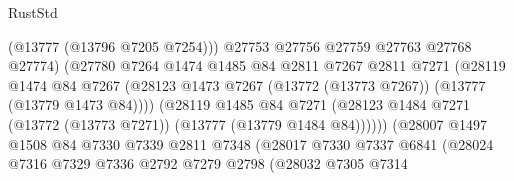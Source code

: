 \begin{lexlean}{RustStd}
\begin{coremodule}
                                        (@13777 (@13796 @7205 @7254)))
                                      @27753
                                      @27756
                                      @27759
                                      @27763
                                      @27768
                                      @27774)
                                    (@27780
                                      @7264
                                      @1474
                                      @1485
                                      @84
                                      @2811
                                      @7267
                                      @2811
                                      @7271
                                      (@28119
                                        @1474
                                        @84
                                        @7267
                                        (@28123
                                          @1473
                                          @7267
                                          (@13772 (@13773 @7267))
                                          (@13777 (@13779 @1473 @84))))
                                      (@28119
                                        @1485
                                        @84
                                        @7271
                                        (@28123
                                          @1484
                                          @7271
                                          (@13772 (@13773 @7271))
                                          (@13777 (@13779 @1484 @84))))))
                                  (@28007
                                    @1497
                                    @1508
                                    @84
                                    @7330
                                    @7339
                                    @2811
                                    @7348
                                    (@28017
                                      @7330
                                      @7337
                                      @6841
                                      (@28024
                                        @7316
                                        @7329
                                        @7336
                                        @2792
                                        @7279
                                        @2798
                                        (@28032
                                          @7305
                                          @7314

\end{coremodule}
\end{lexlean}
